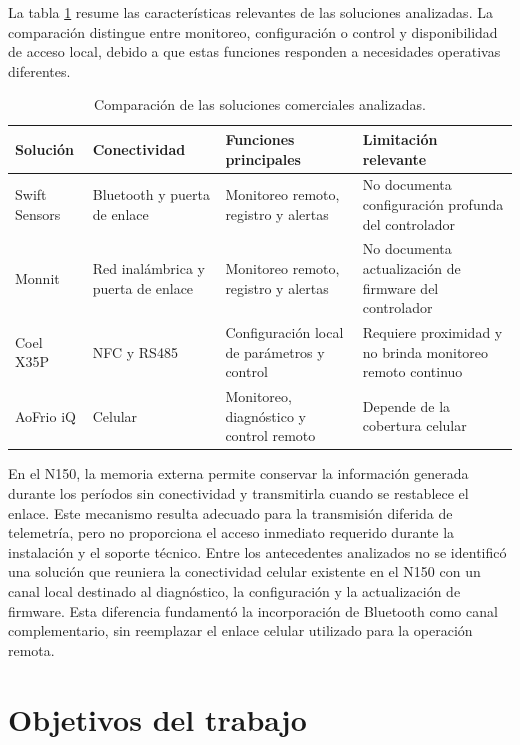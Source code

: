 La tabla \ref{tab:comparacion_estado_arte} resume las características relevantes de las soluciones analizadas. La comparación distingue entre monitoreo, configuración o control y disponibilidad de acceso local, debido a que estas funciones responden a necesidades operativas diferentes.

\begin{table}[h]
	\centering
	\caption[Comparación de soluciones]{Comparación de las soluciones comerciales analizadas.}
	\small
	\begin{tabular}{p{2.3cm} p{2.6cm} p{3.8cm} p{3.2cm}}
		\toprule
		\textbf{Solución} & \textbf{Conectividad} & \textbf{Funciones principales} & \textbf{Limitación relevante} \\
		\midrule
		Swift Sensors & Bluetooth y puerta de enlace & Monitoreo remoto, registro y alertas & No documenta configuración profunda del controlador \\
		Monnit & Red inalámbrica y puerta de enlace & Monitoreo remoto, registro y alertas & No documenta actualización de firmware del controlador \\
		Coel X35P & NFC y RS485 & Configuración local de parámetros y control & Requiere proximidad y no brinda monitoreo remoto continuo \\
		AoFrio iQ & Celular & Monitoreo, diagnóstico y control remoto & Depende de la cobertura celular \\
		\bottomrule
		\hline
	\end{tabular}
	\label{tab:comparacion_estado_arte}
\end{table}

En el N150, la memoria externa permite conservar la información generada durante los períodos sin conectividad y transmitirla cuando se restablece el enlace. Este mecanismo resulta adecuado para la transmisión diferida de telemetría, pero no proporciona el acceso inmediato requerido durante la instalación y el soporte técnico. Entre los antecedentes analizados no se identificó una solución que reuniera la conectividad celular existente en el N150 con un canal local destinado al diagnóstico, la configuración y la actualización de firmware. Esta diferencia fundamentó la incorporación de Bluetooth como canal complementario, sin reemplazar el enlace celular utilizado para la operación remota.


\section{Objetivos del trabajo}

